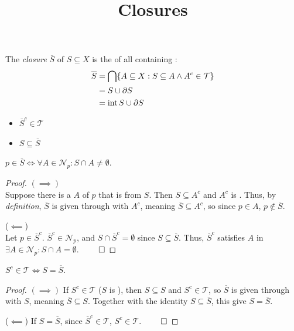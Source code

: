 \documentclass{atomic}
\title{Closures}
\begin{document}
    \pagestyle{plain}  \noindent
    The \textit{closure} $\overline{S}$ of $S \subseteq X$ is the  of all containing :
    \begin{align*}
        \overline{S} &= \bigcap \{ A \subseteq X : S \subseteq A \land A^c \in \mathcal{T} \} \\
        &= S \cup \partial S \\
        &= \operatorname{int} S \cup \partial S
    \end{align*}

    \begin{itemize}
        \item $\overline{S}^c \in \mathcal{T}$
        \item $S \subseteq \overline{S}$
    \end{itemize}

    \begin{characterisation*} \label{characterisation}
        $p \in \overline{S} \iff \forall A \in \mathcal{N}_p : S \cap A \ne \emptyset$\footnotemark.
    \end{characterisation*}
    \begin{proof}
        $\left( \implies \right)$ \textbf{} \\
        Suppose there is a  $A$ of $p$ that is  from $S$. 
        Then $S \subseteq A^c$ and $A^c$ is .
        Thus, by \textit{definition}, $\overline{S}$ is given through  with $A^c$, meaning $\overline{S} \subseteq A^c$, so since $p \in A$, $p \notin \overline{S}$.

        ($\impliedby$) \textbf{} \\
        Let $p \in \overline{S}^c$. $\overline{S}^c \in \mathcal{N}_p$, and $S \cap \overline{S}^c = \emptyset$ since $S \subseteq \overline{S}$.
        Thus, $\overline{S}^c$ satisfies $A$ in $\exists A \in \mathcal{N}_p : S \cap A = \emptyset$. $\qed$
    \end{proof}

    \begin{theorem}
        $S^c \in \mathcal{T} \iff S = \overline{S}$.
    \end{theorem}
    \begin{proof}
        $\left( \implies \right)$
        If $S^c \in \mathcal{T}$ ($S$ is ), then $S \subseteq S$ and $S^c \in \mathcal{T}$, so $\overline{S}$ is given through  with $S$, meaning $\overline{S} \subseteq S$. Together with the identity $S \subseteq \overline{S}$, this give $S = \overline{S}$.

        ($\impliedby$)
        If $S = \overline{S}$, since $\overline{S}^c \in \mathcal{T}$, $S^c \in \mathcal{T}$. $\qed$
    \end{proof}
    
\end{document}
